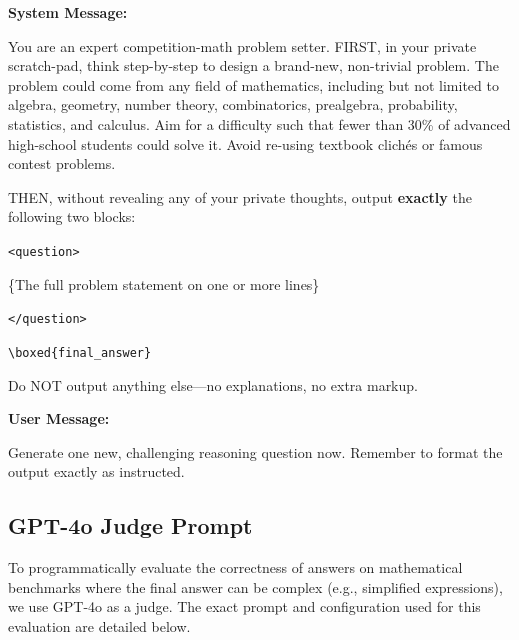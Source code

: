 \begin{tcolorbox}[
  colback=blue!5!white,
  colframe=blue!75!black,
  title=\textbf{Challenger Prompt Template},
  fonttitle=\bfseries,
  sharp corners
]
\textbf{System Message:}
\par
You are an expert competition-math problem setter. FIRST, in your private scratch-pad, think step-by-step to design a brand-new, non-trivial problem. The problem could come from any field of mathematics, including but not limited to algebra, geometry, number theory, combinatorics, prealgebra, probability, statistics, and calculus. Aim for a difficulty such that fewer than 30\% of advanced high-school students could solve it. Avoid re-using textbook clichés or famous contest problems.
\par
THEN, without revealing any of your private thoughts, output \textbf{exactly} the following two blocks:
\par \vspace{0.5em}
\texttt{<question>} \par
\{The full problem statement on one or more lines\} \par
\texttt{</question>} \par
\vspace{1em}
\texttt{\textbackslash boxed\{final\_answer\}} \par
\vspace{1em}
Do NOT output anything else—no explanations, no extra markup.

\textbf{User Message:}
\par
Generate one new, challenging reasoning question now. Remember to format the output exactly as instructed.
\end{tcolorbox}

\subsection{GPT-4o Judge Prompt}
To programmatically evaluate the correctness of answers on mathematical benchmarks where the final answer can be complex (e.g., simplified expressions), we use GPT-4o as a judge. The exact prompt and configuration used for this evaluation are detailed below.

